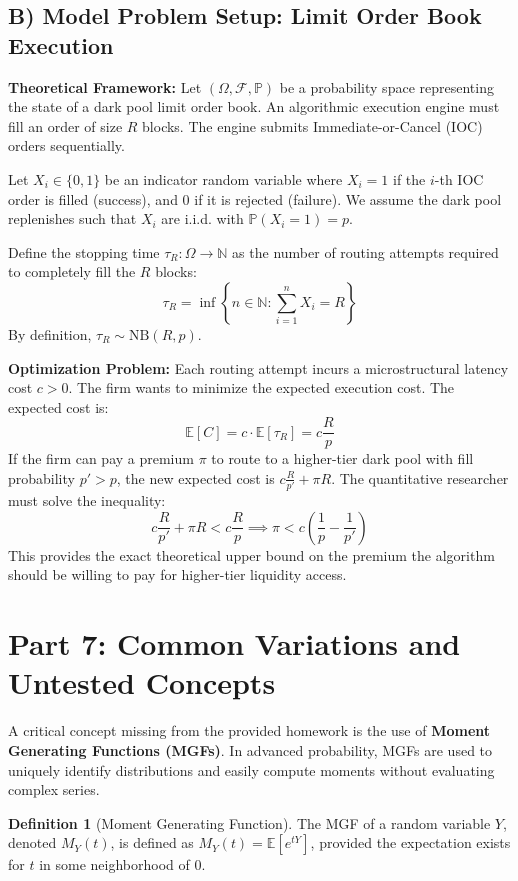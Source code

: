 \documentclass[11pt, letterpaper]{article}
\theoremstyle{definition}
\newtheorem{definition}{Definition}[section]
\theoremstyle{remark}
\newcommand{\E}{\mathbb{E}}
\newcommand{\Prob}{\mathbb{P}}
\newcommand{\N}{\mathbb{N}}
\newcommand{\F}{\mathcal{F}}
\begin{document}
\subsection{B) Model Problem Setup: Limit Order Book Execution}
\textbf{Theoretical Framework:}
Let $(\Omega, \F, \Prob)$ be a probability space representing the state of a dark pool limit order book. An algorithmic execution engine must fill an order of size $R$ blocks. The engine submits Immediate-or-Cancel (IOC) orders sequentially. 

Let $X_i \in \{0, 1\}$ be an indicator random variable where $X_i = 1$ if the $i$-th IOC order is filled (success), and $0$ if it is rejected (failure). We assume the dark pool replenishes such that $X_i$ are i.i.d. with $\Prob(X_i = 1) = p$.

Define the stopping time $\tau_R: \Omega \to \N$ as the number of routing attempts required to completely fill the $R$ blocks:
\[ \tau_R = \inf \left\{ n \in \N : \sum_{i=1}^n X_i = R \right\} \]
By definition, $\tau_R \sim \mathrm{NB}(R, p)$. 

\textbf{Optimization Problem:}
Each routing attempt incurs a microstructural latency cost $c > 0$. The firm wants to minimize the expected execution cost. The expected cost is:
\[ \E[C] = c \cdot \E[\tau_R] = c \frac{R}{p} \]
If the firm can pay a premium $\pi$ to route to a higher-tier dark pool with fill probability $p' > p$, the new expected cost is $c \frac{R}{p'} + \pi R$. The quantitative researcher must solve the inequality:
\[ c \frac{R}{p'} + \pi R < c \frac{R}{p} \implies \pi < c \left( \frac{1}{p} - \frac{1}{p'} \right) \]
This provides the exact theoretical upper bound on the premium the algorithm should be willing to pay for higher-tier liquidity access.

\newpage

\section{Part 7: Common Variations and Untested Concepts}

A critical concept missing from the provided homework is the use of \textbf{Moment Generating Functions (MGFs)}. In advanced probability, MGFs are used to uniquely identify distributions and easily compute moments without evaluating complex series.

\begin{definition}[Moment Generating Function]
The MGF of a random variable $Y$, denoted $M_Y(t)$, is defined as $M_Y(t) = \E[e^{tY}]$, provided the expectation exists for $t$ in some neighborhood of 0.
\end{definition}
\end{document}
